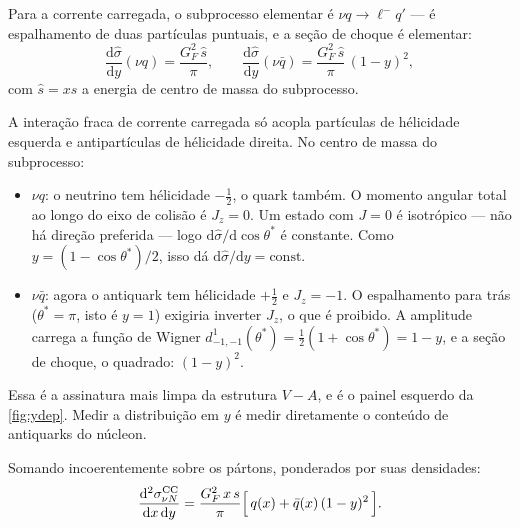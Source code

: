 \documentclass[11pt,a4paper,oneside]{report}
\newcommand{\md}{\mathrm{d}}
\begin{document}
Para a corrente carregada, o subprocesso elementar é $\nu q \to \ell^- q'$ --- é
espalhamento de duas partículas puntuais, e a seção de choque é elementar:
\begin{equation}
  \frac{\md\hat\sigma}{\md y}(\nu q) = \frac{G_F^2\,\hat s}{\pi},
  \qquad
  \frac{\md\hat\sigma}{\md y}(\nu \bar q) = \frac{G_F^2\,\hat s}{\pi}\,(1-y)^2,
  \label{eq:subproc}
\end{equation}
com $\hat s = x s$ a energia de centro de massa do subprocesso.

\begin{deducao}
A interação fraca de corrente carregada só acopla partículas de hélicidade
esquerda e antipartículas de hélicidade direita. No centro de massa do
subprocesso:
\begin{itemize}[leftmargin=*,itemsep=2pt]
\item $\nu q$: o neutrino tem hélicidade $-\tfrac12$, o quark também. O momento
  angular total ao longo do eixo de colisão é $J_z = 0$. Um estado com $J=0$ é
  isotrópico --- não há direção preferida --- logo $\md\hat\sigma/\md\cos\theta^*$
  é constante. Como $y = (1-\cos\theta^*)/2$, isso dá
  $\md\hat\sigma/\md y = \text{const}$.
\item $\nu\bar q$: agora o antiquark tem hélicidade $+\tfrac12$ e
  $J_z = -1$. O espalhamento para trás ($\theta^*=\pi$, isto é $y=1$) exigiria
  inverter $J_z$, o que é proibido. A amplitude carrega a função de Wigner
  $d^{1}_{-1,-1}(\theta^*) = \tfrac{1}{2}(1+\cos\theta^*) = 1-y$, e a seção de
  choque, o quadrado: $(1-y)^2$.
\end{itemize}
Essa é a assinatura mais limpa da estrutura $V-A$, e é o painel esquerdo da
\cref{fig:ydep}. Medir a distribuição em $y$ é medir diretamente o conteúdo de
antiquarks do núcleon.
\end{deducao}

Somando incoerentemente sobre os pártons, ponderados por suas densidades:
\begin{equation}
  \frac{\md^2\sigma^{\rm CC}_{\nu N}}{\md x\,\md y}
  = \frac{G_F^2\,x\,s}{\pi}\Big[\,q(x) + \bar q(x)\,(1-y)^2\,\Big].
  \label{eq:partonxsec}
\end{equation}
\end{document}

